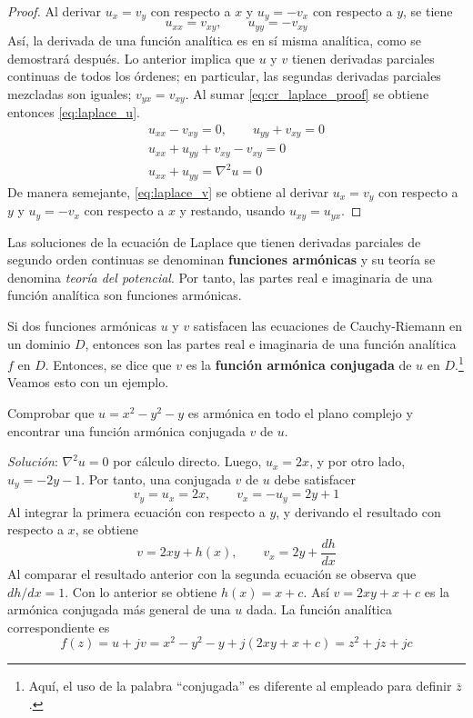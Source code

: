 \begin{proof}
  Al derivar $u_x = v_y$ con respecto a $x$ y $u_y=-v_x$ con respecto a $y$, se tiene
  \begin{equation}\label{eq:cr_laplace_proof}
    u_{xx}=v_{xy}, \qquad u_{yy} = -v_{xy}
  \end{equation}
  Así, la derivada de una función analítica es en sí misma analítica, como se demostrará después. Lo anterior implica que $u$ y $v$ tienen derivadas parciales continuas de todos los órdenes; en particular, las segundas derivadas parciales mezcladas son iguales; $v_{yx}= v_{xy}$. Al sumar \ref{eq:cr_laplace_proof} se obtiene entonces \ref{eq:laplace_u}.
  \begin{gather*}
    u_{xx}-v_{xy}=0, \qquad u_{yy}+v_{xy}=0 \\ 
    u_{xx}+u_{yy}+v_{xy}-v_{xy}=0 \\ 
    u_{xx}+u_{yy}=\nabla^2 u=0 
  \end{gather*}
  De manera semejante, \ref{eq:laplace_v} se obtiene al derivar $u_x=v_y$ con respecto a $y$ y $u_y=-v_x$ con respecto a $x$ y restando, usando $u_{xy}=u_{yx}$.
\end{proof}

Las soluciones de la ecuación de Laplace que tienen derivadas parciales de segundo orden continuas se denominan \textbf{funciones armónicas} y su teoría se denomina \textit{teoría del potencial}. Por tanto, las partes real e imaginaria de una función analítica son funciones armónicas.

Si dos funciones armónicas $u$ y $v$ satisfacen las ecuaciones de Cauchy-Riemann en un dominio $D$, entonces son las partes real e imaginaria de una función analítica $f$ en $D$. Entonces, se dice que $v$ es la \textbf{función armónica conjugada} de $u$ en $D$.\footnote{Aquí, el uso de la palabra ``conjugada'' es diferente al empleado para definir $\bar{z}$.} Veamos esto con un ejemplo.

\begin{example}
  Comprobar que $u=x^2-y^2 -y$ es armónica en todo el plano complejo y encontrar una función armónica conjugada $v$ de $u$.

  \textit{Solución}: $\nabla^2 u =0$ por cálculo directo. Luego, $u_x=2x$, y por otro lado, $u_y=-2y-1$. Por tanto, una conjugada $v$ de $u$ debe satisfacer
  \begin{equation*}
    v_y = u_x = 2x,\qquad v_x=-u_y = 2y+1
  \end{equation*}
  Al integrar la primera ecuación con respecto a $y$, y derivando el resultado con respecto a $x$, se obtiene
  \begin{equation*}
    v=2xy + h(x), \qquad v_x = 2y + \frac{dh}{dx}
  \end{equation*}
  Al comparar el resultado anterior con la segunda ecuación se observa que $dh/dx=1$. Con lo anterior se obtiene $h(x)=x+c$. Así $v=2xy+x+c$ es la armónica conjugada más general de una $u$ dada. La función analítica correspondiente es
  \[
    f(z)=u+jv=x^2-y^2-y+j(2xy+x+c)=z^2 +jz +jc
  \]
\end{example}


